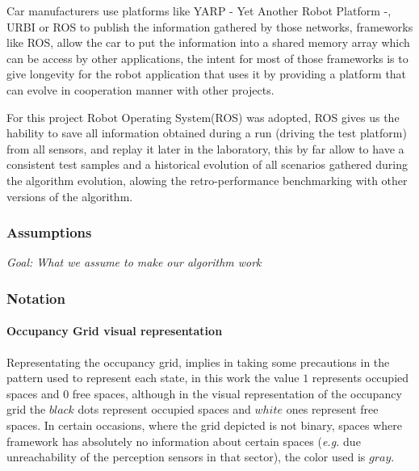 Car manufacturers use platforms like YARP - Yet Another Robot Platform -, URBI or ROS to publish the information gathered by those networks, frameworks like ROS, allow the car to put the information into a shared memory array which can be access by other applications, the intent for most of those frameworks is to give longevity\cite{Fitzpatrick:2008:TLR:1327539.1327705} for the robot application that uses it by providing a platform that can evolve in cooperation manner with other projects.

For this project Robot Operating System(ROS) was adopted, ROS gives us the hability to save all information obtained during a run (driving the test platform) from all sensors, and replay it later in the laboratory, this by far allow to have a consistent test samples and a historical evolution of all scenarios gathered during the algorithm evolution, alowing the retro-performance benchmarking with other versions of the algorithm.

\subsubsection*{Assumptions}

\textit{Goal: What we assume to make our algorithm work}

\subsubsection*{Notation}

\paragraph{Occupancy Grid visual representation}

Representating the occupancy grid, implies in taking some precautions in the pattern used to represent each state, in this work the value $1$ represents occupied spaces and $0$ free spaces, although in the visual representation of the occupancy grid the $black$ dots represent occupied spaces and $white$ ones represent free spaces. In certain occasions, where the grid depicted is not binary, spaces where framework has absolutely no information about certain spaces (\textit{e.g.} due unreachability of the perception sensors in that sector), the color used is $gray$.


